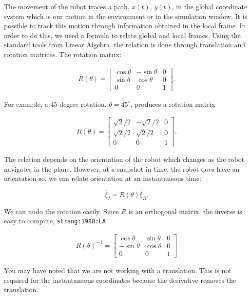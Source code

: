 The movement of the robot traces a path, \(x(t)\), \(y(t)\), in the
global coordinate system which is our motion in the environment or in
the simulation window. It is possible to track this motion through
information obtained in the local frame. In order to do this, we need a
formula to relate global and local frames. Using the standard tools from
Linear Algebra, the relation is done through translation and rotation
matrices. The rotation matrix:

\[\begin{aligned}
R(\theta) = \begin{bmatrix} \cos \theta & -\sin \theta & 0 \\ \sin \theta &
\cos \theta & 0 \\
                   0 & 0 & 1
              \end{bmatrix} .
\end{aligned}\]

For example, a 45 degree rotation, \(\theta = 45^\circ\), produces a
rotation matrix

\[\begin{aligned}
R(\theta) =\begin{bmatrix} \sqrt{2}/2 &
-\sqrt{2}/2 & 0 \\ \sqrt{2}/2 & \sqrt{2}/2 & 0 \\
                   0 & 0 & 1
              \end{bmatrix}.
\end{aligned}\]

The relation depends on the orientation of the robot which changes as
the robot navigates in the plane. However, at a snapshot in time, the
robot does have an orientation so, we can relate orientation at an
instantaneous time:

\[\dot{\xi_I} = R(\theta) \dot{\xi_R}.\]

We can undo the rotation easily. Since \(R\) is an orthogonal matrix,
the inverse is easy to compute, \texttt{strang:1988:LA}

\[\begin{aligned}
R(\theta)^{-1} = \begin{bmatrix} \cos \theta & \sin \theta & 0 \\ -\sin \theta
& \cos \theta & 0 \\
                   0 & 0 & 1
              \end{bmatrix}
\end{aligned}\]

You may have noted that we are not working with a translation. This is
not required for the instantaneous coordinates because the derivative
removes the translation.

